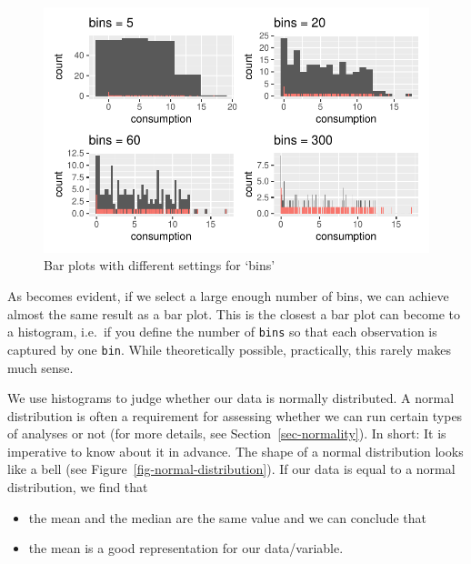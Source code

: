 \documentclass[
  letterpaper,
  DIV=11,
  numbers=noendperiod]{scrreprt}
\begin{document}
\begin{figure}[H]

{\centering \includegraphics{08_descriptive_statistics_files/figure-latex/histograms-bins-output-1.pdf}

}

\caption{Bar plots with different settings for `bins'}

\end{figure}%

As becomes evident, if we select a large enough number of bins, we can
achieve almost the same result as a bar plot. This is the closest a bar
plot can become to a histogram, i.e.~if you define the number of
\texttt{bins} so that each observation is captured by one \texttt{bin}.
While theoretically possible, practically, this rarely makes much sense.

We use histograms to judge whether our data is normally distributed. A
normal distribution is often a requirement for assessing whether we can
run certain types of analyses or not (for more details, see
Section~\ref{sec-normality}). In short: It is imperative to know about
it in advance. The shape of a normal distribution looks like a bell (see
Figure~\ref{fig-normal-distribution}). If our data is equal to a normal
distribution, we find that

\begin{itemize}
\item
  the mean and the median are the same value and we can conclude that
\item
  the mean is a good representation for our data/variable.
\end{itemize}
\end{document}
